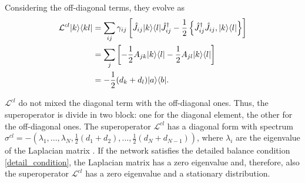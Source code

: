 Considering the off-diagonal terms, they evolve as 
\begin{equation}
    \begin{split}
        \mathcal{L}^{cl}\lvert k\rangle\langle kl\rvert &= \sum_{ij}\gamma_{ij}\left[\hat J_{ij} \lvert k\rangle\langle l\rvert\hat J_{ij}^\dagger -\frac{1}{2} \left\{ \hat J_{ij}^\dagger \hat J_{ij}, \lvert k\rangle\langle l\rvert\right\}\right]\\
        &= \sum_{j}\left[-\frac{1}{2} A_{jk}\lvert k\rangle\langle l\rvert - \frac{1}{2} A_{jl}\lvert k\rangle\langle l\rvert\right]\\
        &= - \frac{1}{2}(d_k + d_l)\lvert a\rangle\langle b\rvert.
    \end{split} 
\end{equation}

$\mathcal{L}^{cl}$ do not mixed the diagonal term with the off-diagonal ones. Thus, the superoperator is divide in two block: one for the diagonal element, the other for the off-diagonal ones.
The superoperator $\mathcal{L}^{cl}$ has a diagonal form with spectrum $\sigma^{cl} = -(\lambda_1,...,\lambda_N,\frac{1}{2}(d_1 + d_2),...,\frac{1}{2}(d_N + d_{N-1}))$, where $\lambda_i$ are the eigenvalue of the Laplacian matrix \cite{Bruderer_Plenio}.
If the network satisfies the detailed balance condition \eqref{detail_condition}, the Laplacian matrix has a zero eigenvalue and, therefore, also the superoperator $\mathcal{L}^{cl}$ has a zero eigenvalue and a stationary distribution.


